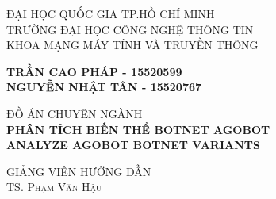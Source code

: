 
\begin{titlepage} %
  \newcommand{\HRule}{\rule{\linewidth}{0.5mm}} %

  \begin{center} %


  {\Large ĐẠI HỌC QUỐC GIA TP.HỒ CHÍ MINH}\\
  {\subtitlesize TRƯỜNG ĐẠI HỌC CÔNG NGHỆ THÔNG TIN}\\ %
  {\subtitlesize KHOA MẠNG MÁY TÍNH VÀ TRUYỀN THÔNG}\\ %


  \vfill
  \vfill

  \textbf{\large TRẦN CAO PHÁP - 15520599\\ NGUYỄN NHẬT TÂN - 15520767}\\


  \vfill
  \vfill

  {\Large ĐỒ ÁN CHUYÊN NGÀNH}\\[0.2cm] %
  \textbf{\LARGE PHÂN TÍCH BIẾN THỂ BOTNET AGOBOT}\\ %
  \textbf{\LARGE ANALYZE AGOBOT BOTNET VARIANTS}\\ %

  \vfill %

  {\large {GIẢNG VIÊN HƯỚNG DẪN} }\\
  \textsc{TS. Phạm Văn Hậu} %


\end{center}
\end{titlepage}
